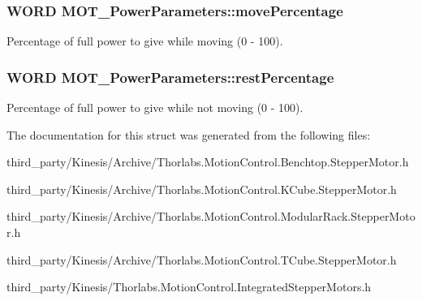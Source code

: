 \subsubsection[{\texorpdfstring{move\+Percentage}{movePercentage}}]{\setlength{\rightskip}{0pt plus 5cm}W\+O\+RD M\+O\+T\+\_\+\+Power\+Parameters\+::move\+Percentage}\hypertarget{struct_m_o_t___power_parameters_aca9f0ebd5a40f420cfe5ec7e8bd14cb2}{}\label{struct_m_o_t___power_parameters_aca9f0ebd5a40f420cfe5ec7e8bd14cb2}


Percentage of full power to give while moving (0 -\/ 100). 

\subsubsection[{\texorpdfstring{rest\+Percentage}{restPercentage}}]{\setlength{\rightskip}{0pt plus 5cm}W\+O\+RD M\+O\+T\+\_\+\+Power\+Parameters\+::rest\+Percentage}\hypertarget{struct_m_o_t___power_parameters_a8fb98520378f46ac36cab00c45f2732d}{}\label{struct_m_o_t___power_parameters_a8fb98520378f46ac36cab00c45f2732d}


Percentage of full power to give while not moving (0 -\/ 100). 



The documentation for this struct was generated from the following files\+:\begin{DoxyCompactItemize}
\item 
third\+\_\+party/\+Kinesis/\+Archive/Thorlabs.\+Motion\+Control.\+Benchtop.\+Stepper\+Motor.\+h\item 
third\+\_\+party/\+Kinesis/\+Archive/Thorlabs.\+Motion\+Control.\+K\+Cube.\+Stepper\+Motor.\+h\item 
third\+\_\+party/\+Kinesis/\+Archive/Thorlabs.\+Motion\+Control.\+Modular\+Rack.\+Stepper\+Motor.\+h\item 
third\+\_\+party/\+Kinesis/\+Archive/Thorlabs.\+Motion\+Control.\+T\+Cube.\+Stepper\+Motor.\+h\item 
third\+\_\+party/\+Kinesis/Thorlabs.\+Motion\+Control.\+Integrated\+Stepper\+Motors.\+h\end{DoxyCompactItemize}
